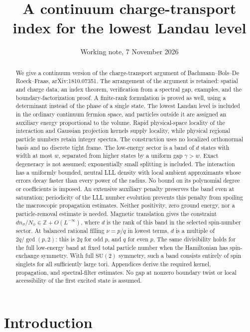 \documentclass[11pt]{article}
\title{A continuum charge-transport index for the lowest Landau level}
\author{}
\date{Working note, 7 November 2026}
\theoremstyle{definition}
\theoremstyle{remark}
\begin{document}
\maketitle
\begin{abstract}
We give a continuum version of the charge-transport argument of
Bachmann--Bols--De Roeck--Fraas, arXiv:1810.07351.
The arrangement of the argument is retained: spatial and charge data,
an index theorem, verification from a spectral gap, examples, and the
boundary-factorization proof.  A finite-rank formulation is proved as
well, using a determinant instead of the phase of a single state.
The lowest Landau level is included in the ordinary continuum fermion
space, and particles outside it are assigned an auxiliary energy
proportional to the volume.  Rapid physical-space locality of the
interaction and Gaussian projection kernels supply locality, while physical
regional particle numbers retain integer spectra.  The construction
uses no localized orthonormal basis and no discrete tight frame.
The low-energy sector is a band of \(d\) states with width at most
\(w\), separated from higher states by a uniform gap \(\gamma>w\).
Exact degeneracy is not assumed; exponentially small splitting is
included.  The interaction has a uniformly bounded, neutral LLL density
with local ambient approximants whose errors decay faster than every
power of the radius.  No bound on its polynomial degree or coefficients
is imposed.  An extensive auxiliary penalty preserves the band even at
saturation; periodicity of the LLL number evolution prevents this penalty
from spoiling the macroscopic propagation estimates.  Neither positivity,
zero ground energy, nor a particle-removal estimate is needed.
Magnetic translation gives the constraint
\(dn_\sigma/N_\phi\in\mathbb Z+O(L^{-\infty})\), where \(d\)
is the rank of this band in the selected spin-number sector.
At balanced rational filling \(\nu=p/q\) in lowest terms,
\(d\) is a multiple of \(2q/\gcd(p,2)\): this is \(2q\)
for odd \(p\), and \(q\) for even \(p\).
The same divisibility holds for the full low-energy band at fixed total
particle number when the Hamiltonian has spin-exchange symmetry.
With full \(\mathrm{SU}(2)\) symmetry, such a band consists entirely
of spin singlets for all sufficiently large tori.
Appendices derive the required kernel, propagation, and spectral-filter
estimates.
No gap at nonzero boundary twist or local accessibility of the first
excited state is assumed.
\end{abstract}
\tableofcontents

\section{Introduction}
\end{document}
